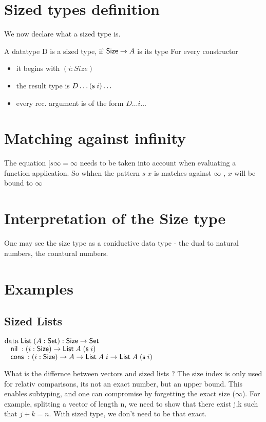 \section{Sized types definition}
We now declare what a sized type is.
\begin{definition}
A datatype D is a sized type, if $ \mathsf{Size} \rightarrow A $ is its type
For every constructor 
\begin{itemize}
\item
it begins with $(i: Size)$
\item
the result type is $D \dots (\mathsf{s}\; i) \dots $
\item
every rec. argument is of the form $ D \dots i \dots $
\end{itemize}
\end{definition}
\section{Matching against infinity}
The equation 
$[ s \infty = \infty $
needs to be taken into account when evaluating a function application.
So whhen the pattern $ s \; x $ is matches against $ \infty $ , $x$ will be bound to $ \infty $  
\section{Interpretation of the Size type}
One may see the size type as a coniductive data type - the dual to natural numbers, the conatural numbers.
\section{Examples}
\subsection{Sized Lists}
\begin{bsp}
$\mathrm{data}\; \mathsf{List}\; ( A : \mathsf{Set} ) : \mathsf{Size} \rightarrow \mathsf{Set} $ \\
$\hspace*{3mm} \mathsf{nil}\; : ( i : \mathsf{Size} ) \rightarrow{ \mathsf{List}\;A \; (\mathsf{s}\;i)} $\\
$\hspace*{3mm} \mathsf{cons}\; : ( i : \mathsf{Size} ) \rightarrow{ A \rightarrow\mathsf{List}\;A \; i \rightarrow\mathsf{List}\;A \; (\mathsf{s}\;i)} $
\end{bsp}

What is the differnce between vectors and sized lists ?
The size index is only used for relativ comparisons, its not an exact number, but an upper bound.
This enables subtyping, and one can compromise by forgetting the exact size ($\infty$).
For example, splitting a vector of length n, we need to show that there exist j,k such that $j+k = n$.
With sized type, we don't need to be that exact.
